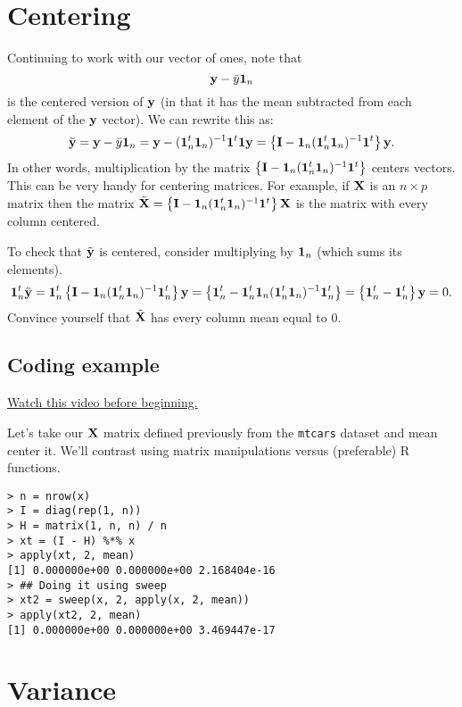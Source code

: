 \section{Centering}

Continuing to work with our vector of ones, note that 
$$
\mathbf{y} - \bar y \mathbf{1}_n
$$
is the centered version of $\mathbf{y}$ (in that it has the mean subtracted from each element of the $\mathbf{y}$ vector).
We can rewrite this as:
$$
\tilde {\mathbf{y}} = \mathbf{y} - \bar y \mathbf{1}_n = \mathbf{y} - (\mathbf{1}_n^t \mathbf{1}_n)^{-1} \mathbf{1}^t \mathbf{1} \mathbf{y}
= \left\{ \mathbf{I} - \mathbf{1}_n (\mathbf{1}_n^t \mathbf{1}_n)^{-1} \mathbf{1}^t \right\} \mathbf{y}.
$$
In other words, multiplication by the matrix $ \left\{ \mathbf{I} - \mathbf{1}_n (\mathbf{1}_n^t \mathbf{1}_n)^{-1} \mathbf{1}^t \right\}$
centers vectors. This can be very handy for centering matrices. For example, if $\mathbf{X}$ is an $n\times p$
matrix then the matrix $\tilde {\mathbf{X}}  = \left\{ \mathbf{I} - \mathbf{1}_n (\mathbf{1}_n^t \mathbf{1}_n)^{-1} \mathbf{1}^t \right\} \mathbf{X}$
is the matrix with every column centered. 

To check that $\tilde {\mathbf{y}}$ is centered, consider multiplying by $\mathbf{1}_n$ (which sums its elements). 
$$
\mathbf{1}_n^t \tilde {\mathbf{y}} = \mathbf{1}_n^t \left\{ \mathbf{I} - \mathbf{1}_n (\mathbf{1}_n^t \mathbf{1}_n)^{-1} \mathbf{1}_n^t \right\} \mathbf{y}
= \left\{ \mathbf{1}_n^t - \mathbf{1}_n^t \mathbf{1}_n (\mathbf{1}_n^t \mathbf{1}_n)^{-1} \mathbf{1}_n^t \right\} =
\left\{ \mathbf{1}_n^t - \mathbf{1}_n^t \right\}\mathbf{y} = 0.
$$
Convince yourself that $\tilde {\mathbf{X}}$ has every column mean equal to 0.

\subsection{Coding example}

\href{https://www.youtube.com/watch?v=sixe0fUr5cg&list=PLpl-gQkQivXhdgUCdaUQcdb31CRe8Mm2y&index=4}{Watch this video before beginning.}

Let's take our $\mathbf{X}$ matrix defined previously from the \texttt{mtcars} dataset and
mean center it. We'll contrast using matrix manipulations versus (preferable)
R functions. 

\begin{verbatim}
> n = nrow(x)
> I = diag(rep(1, n))
> H = matrix(1, n, n) / n
> xt = (I - H) %*% x 
> apply(xt, 2, mean)
[1] 0.000000e+00 0.000000e+00 2.168404e-16
> ## Doing it using sweep
> xt2 = sweep(x, 2, apply(x, 2, mean))
> apply(xt2, 2, mean)
[1] 0.000000e+00 0.000000e+00 3.469447e-17
\end{verbatim}


\section{Variance}


